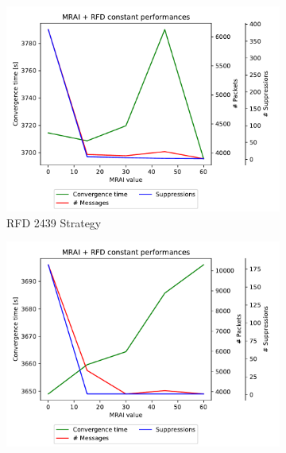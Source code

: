 \begin{figure}[h]
     \centering
     \begin{subfigure}[b]{0.325\textwidth}
         \centering
         \includegraphics[width=\textwidth]{images/RFD/miceVSelephants/MultiMRAI/elephants/cisco_1000_RFD_2439-constant_mrai_rfd_evolution.pdf}
         \caption{RFD 2439 Strategy}
         \label{fig:1000_2439RFD_multiMRAI_elephants}
     \end{subfigure}
     \hfill
     \begin{subfigure}[b]{0.325\textwidth}
         \centering
         \includegraphics[width=\textwidth]{images/RFD/miceVSelephants/MultiMRAI/elephants/cisco_1000_RFD_7196_aggressive-constant_mrai_rfd_evolution.pdf}

\end{subfigure}
\end{figure}
